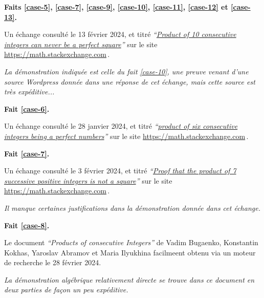 

\bigskip
\textbf{Faits \ref{case-5}, \ref{case-7}, \ref{case-9}, \ref{case-10}, \ref{case-11}, \ref{case-12} et \ref{case-13}.}
	
\smallskip
\noindent
Un échange consulté le 13 février 2024, et titré
\emph{\enquote{\href{https://math.stackexchange.com/q/2361670/52365}{Product of 10 consecutive integers can never be a perfect square}}} 
sur le site \url{https://math.stackexchange.com}\,.

\smallskip
\noindent
\emph{La démonstration indiquée est celle du fait \ref{case-10}, une preuve venant d'une source Wordpress donnée dans une réponse de cet échange, mais cette source est très expéditive...}




\bigskip
\textbf{Fait \ref{case-6}.}
	
\smallskip
\noindent
Un échange consulté le 28 janvier 2024, et titré
\emph{\enquote{\href{https://math.stackexchange.com/q/90894/52365}{product of six consecutive integers being a perfect numbers}}} 
sur le site \url{https://math.stackexchange.com}\,.




\bigskip
\textbf{Fait \ref{case-7}.}
	
\smallskip
\noindent
Un échange consulté le 3 février 2024, et titré
\emph{\enquote{\href{https://math.stackexchange.com/q/2334887/52365}{Proof that the product of 7 successive positive integers is not a square}}} 
sur le site \url{https://math.stackexchange.com}\,.
	
\smallskip
\noindent
\emph{Il manque certaines justifications dans la démonstration donnée dans cet échange.}




\bigskip
\textbf{Fait \ref{case-8}.}
	
\smallskip
\noindent
Le document \emph{\enquote{Products of consecutive Integers}} de Vadim Bugaenko, Konstantin Kokhas, Yaroslav Abramov et Maria Ilyukhina facilmeent obtenu via un moteur de recherche le 28 février 2024.
	
\smallskip
\noindent
\emph{La démonstration algébrique relativement directe se trouve dans ce document en deux parties de façon un peu expéditive.}



